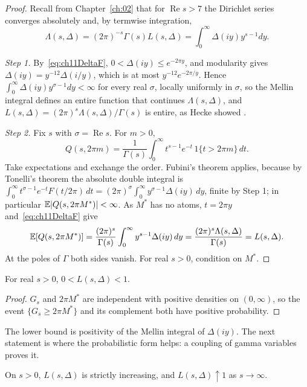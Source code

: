\begin{proof}
Recall from Chapter~\ref{ch:02} that for $\operatorname{Re}s>7$ the Dirichlet series converges absolutely and, by termwise integration,
\[
\Lambda(s,\Delta)=(2\pi)^{-s}\Gamma(s)L(s,\Delta)=\int_0^\infty\Delta(iy)y^{s-1}dy.
\]

\emph{Step 1.} By~\eqref{eq:ch11DeltaF}, $0<\Delta(iy)\le e^{-2\pi y}$, and modularity gives $\Delta(iy)=y^{-12}\Delta(i/y)$, which is at most $y^{-12}e^{-2\pi/y}$. Hence $\int_0^\infty\Delta(iy)y^{\sigma-1}dy<\infty$ for every real $\sigma$, locally uniformly in $\sigma$, so the Mellin integral defines an entire function that continues $\Lambda(s,\Delta)$, and $L(s,\Delta)=(2\pi)^s\Lambda(s,\Delta)/\Gamma(s)$ is entire, as Hecke showed \cite{hecke1936}.

\emph{Step 2.} Fix $s$ with $\sigma=\operatorname{Re}s$. For $m>0$,
\[
Q(s,2\pi m)=\frac1{\Gamma(s)}\int_0^\infty t^{s-1}e^{-t}\,1\{t>2\pi m\}\,dt.
\]
Take expectations and exchange the order. Fubini's theorem applies, because by Tonelli's theorem the absolute double integral is $\int_0^\infty t^{\sigma-1}e^{-t}F(t/2\pi)\,dt=(2\pi)^\sigma\int_0^\infty y^{\sigma-1}\Delta(iy)\,dy$, finite by Step 1; in particular $\mathbb{E}|Q(s,2\pi M^*)|<\infty$. As $M^*$ has no atoms, $t=2\pi y$ and~\eqref{eq:ch11DeltaF} give
\[
\mathbb{E}[Q(s,2\pi M^*)]=\frac{(2\pi)^s}{\Gamma(s)}\int_0^\infty y^{s-1}\Delta(iy)\,dy=\frac{(2\pi)^s\Lambda(s,\Delta)}{\Gamma(s)}=L(s,\Delta).
\] At the poles of $\Gamma$ both sides vanish. For real $s>0$, condition on $M^*$.
\end{proof}

\begin{corollary}\label{cor:ch11bounds}
For real $s>0$, $0<L(s,\Delta)<1$.
\end{corollary}

\begin{proof}
$G_s$ and $2\pi M^*$ are independent with positive densities on $(0,\infty)$, so the event $\{G_s\ge2\pi M^*\}$ and its complement both have positive probability.
\end{proof}

The lower bound is positivity of the Mellin integral of $\Delta(iy)$. The next statement is where the probabilistic form helps: a coupling of gamma variables proves it.

\begin{corollary}\label{cor:ch11monotone}
On $s>0$, $L(s,\Delta)$ is strictly increasing, and $L(s,\Delta)\uparrow1$ as $s\to\infty$.
\end{corollary}

